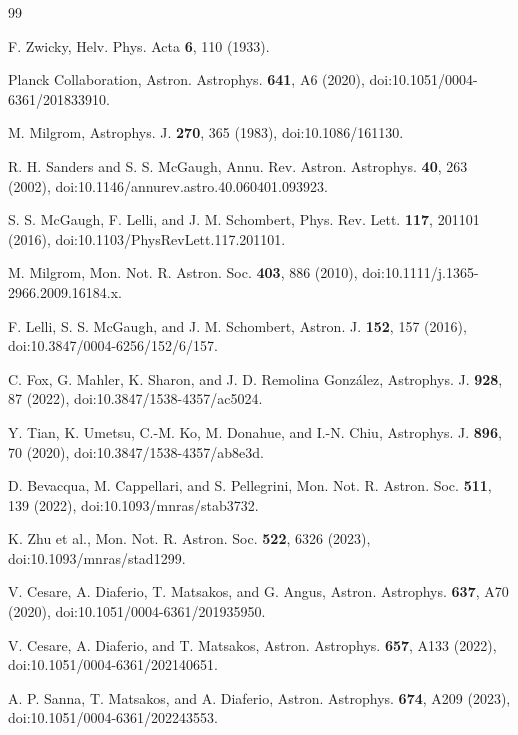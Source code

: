 \documentclass[aps,prd,reprint,superscriptaddress,showpacs,floatfix,longbibliography]{revtex4-2}
\begin{document}
\begin{thebibliography}{99}

 F. Zwicky, Helv. Phys. Acta \textbf{6}, 110 (1933).

 Planck Collaboration, Astron. Astrophys. \textbf{641}, A6 (2020), doi:10.1051/0004-6361/201833910.

 M. Milgrom, Astrophys. J. \textbf{270}, 365 (1983), doi:10.1086/161130.

 R. H. Sanders and S. S. McGaugh, Annu. Rev. Astron. Astrophys. \textbf{40}, 263 (2002), doi:10.1146/annurev.astro.40.060401.093923.

 S. S. McGaugh, F. Lelli, and J. M. Schombert, Phys. Rev. Lett. \textbf{117}, 201101 (2016), doi:10.1103/PhysRevLett.117.201101.

 M. Milgrom, Mon. Not. R. Astron. Soc. \textbf{403}, 886 (2010), doi:10.1111/j.1365-2966.2009.16184.x.

 F. Lelli, S. S. McGaugh, and J. M. Schombert, Astron. J. \textbf{152}, 157 (2016), doi:10.3847/0004-6256/152/6/157.

 C. Fox, G. Mahler, K. Sharon, and J. D. Remolina Gonz\'alez, Astrophys. J. \textbf{928}, 87 (2022), doi:10.3847/1538-4357/ac5024.

 Y. Tian, K. Umetsu, C.-M. Ko, M. Donahue, and I.-N. Chiu, Astrophys. J. \textbf{896}, 70 (2020), doi:10.3847/1538-4357/ab8e3d.

 D. Bevacqua, M. Cappellari, and S. Pellegrini, Mon. Not. R. Astron. Soc. \textbf{511}, 139 (2022), doi:10.1093/mnras/stab3732.

 K. Zhu et al., Mon. Not. R. Astron. Soc. \textbf{522}, 6326 (2023), doi:10.1093/mnras/stad1299.

 V. Cesare, A. Diaferio, T. Matsakos, and G. Angus, Astron. Astrophys. \textbf{637}, A70 (2020), doi:10.1051/0004-6361/201935950.

 V. Cesare, A. Diaferio, and T. Matsakos, Astron. Astrophys. \textbf{657}, A133 (2022), doi:10.1051/0004-6361/202140651.

 A. P. Sanna, T. Matsakos, and A. Diaferio, Astron. Astrophys. \textbf{674}, A209 (2023), doi:10.1051/0004-6361/202243553.

\end{thebibliography}
\end{document}
